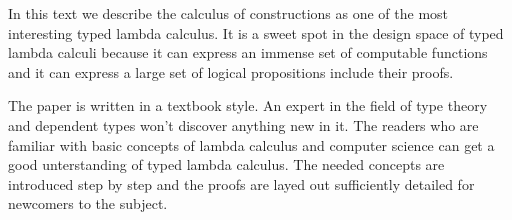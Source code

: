 In this text we describe the calculus of constructions as one of the most
interesting typed lambda calculus. It is a sweet spot in the design space of
typed lambda calculi because it can express an immense set of computable
functions and it can express a large set of logical propositions include their
proofs.

The paper is written in a textbook style.  An expert in the field of type theory
and dependent types won't discover anything new in it. The readers who are
familiar with basic concepts of lambda calculus and computer science can get a
good unterstanding of typed lambda calculus. The needed concepts are introduced
step by step and the proofs are layed out sufficiently detailed for newcomers to
the subject.

